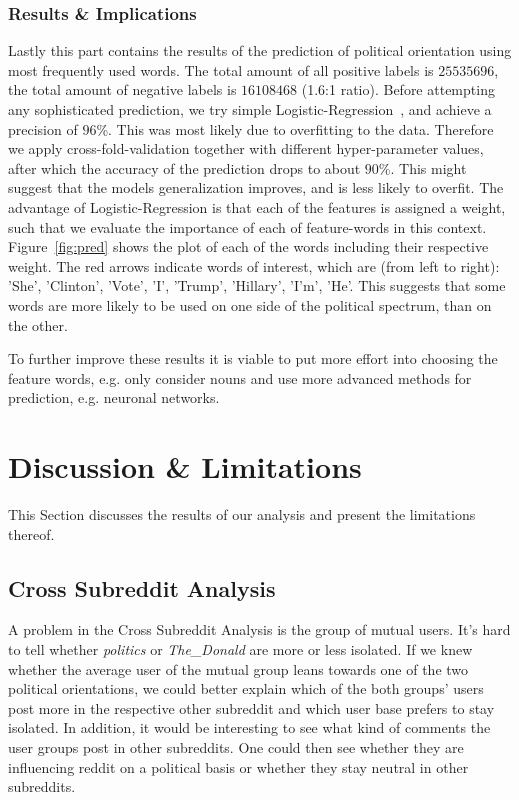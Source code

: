 \documentclass[runningheads,a4paper]{llncs}
\newcommand{\boards}[1]{\textit{politics} #1 \textit{The\_Donald}}
\begin{document}
	\subsubsection{Results \& Implications}
	Lastly this part contains the results of the prediction of political orientation using most frequently used words. The total amount of all positive labels is $25535696$, the total amount of negative labels is $16108468$ (1.6:1 ratio). Before attempting any sophisticated prediction, we try simple Logistic-Regression~\cite{scikit-learn}, and achieve a precision of $96$\%. This was most likely due to overfitting to the data. Therefore we apply cross-fold-validation together with different hyper-parameter values, after which the accuracy of the prediction drops to about $90$\%. This might suggest that the models generalization improves, and is less likely to overfit. The advantage of Logistic-Regression is that each of the features is assigned a weight, such that we evaluate the importance of each of feature-words in this context. Figure~\ref{fig:pred} shows the plot of each of the words including their respective weight. The red arrows indicate words of interest, which are (from left to right): 'She', 'Clinton', 'Vote', 'I', 'Trump', 'Hillary', 'I'm', 'He'. This suggests that some words are more likely to be used on one side of the political spectrum, than on the other.
	
	To further improve these results it is viable to put more effort into choosing the feature words, e.g. only consider nouns and use more advanced methods for prediction, e.g. neuronal networks.
	\section{Discussion \& Limitations}
	This Section discusses the results of our analysis and present the limitations thereof.
	\subsection{Cross Subreddit Analysis}
	A problem in the Cross Subreddit Analysis is the group of mutual users. It's hard to tell whether \boards{or} are more or less isolated.
	If we knew whether the average user of the mutual group leans towards one of the two political orientations, we could better explain which of the both groups' users
	post more in the respective other subreddit and which user base prefers to stay isolated.
	In addition, it would be interesting to see what kind of comments the user groups post in other subreddits.
	One could then see whether they are influencing reddit on a political basis or whether they stay neutral
	in other subreddits.
\end{document}
